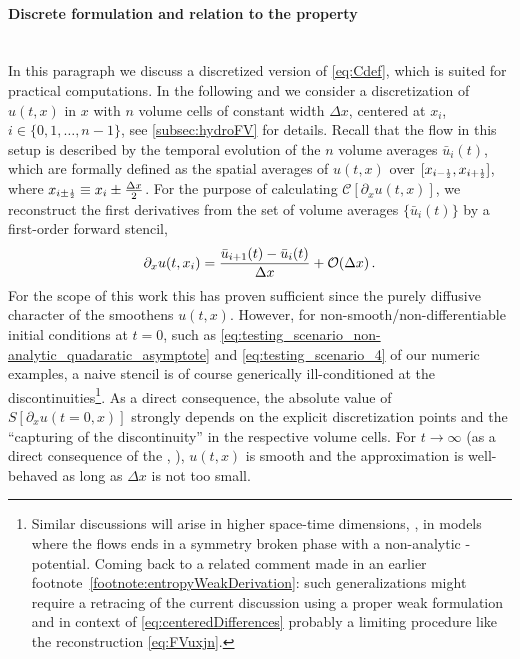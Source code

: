 \paragraph{Discrete formulation and relation to the \tvni{} property}\label{paragraph:discrete_c_and_tvd}\mbox{}\\%
In this paragraph we discuss a discretized version of \cref{eq:Cdef}, which is suited for practical computations.
In the following and \wlogA{} we consider a \fv{} discretization of $u ( t, x )$ in $x$ with $n$ volume cells of constant width $\Delta x$, centered at $x_i$, $i \in \{ 0, 1, \ldots, n - 1\}$, see \cref{subsec:hydroFV} for details.
Recall that the \frg{} flow in this setup is described by the temporal evolution of the $n$ volume averages $\bar{u}_i ( t )$, which are formally defined as the spatial averages of $u ( t, x )$ over $[ x_{i - \ttfrac{1}{2}}, x_{i + \ttfrac{1}{2}} ]$, where $x_{i \pm \ttfrac{1}{2}} \equiv x_i \pm \tfrac{\Delta x}{2}$.
For the purpose of calculating $\mathcal{C} [ \partial_x u ( t, x ) ]$, we reconstruct the first derivatives from the set of volume averages $\{\bar{u}_i(t)\}$ by a first-order \fd{} forward stencil,
\begin{align}
	\partial_x u ( t, x_i ) = \frac{\bar{u}_{i + 1} ( t ) - \bar{u}_{i} ( t )}{\Delta x} + \mathcal{O} (\Delta x) \, .	\label{eq:centeredDifferences}
\end{align}
For the scope of this work this has proven sufficient since the purely diffusive character of the \pde{} smoothens $u ( t, x )$.
However, for non-smooth/non-differentiable initial conditions at $t = 0$, such as \cref{eq:testing_scenario_non-analytic_quadaratic_asymptote} and \eqref{eq:testing_scenario_4} of our numeric examples, a naive \fd{} stencil is of course generically ill-conditioned at the discontinuities\footnote{
	Similar discussions will arise in higher space-time dimensions, \eg{}, in models where the \frg{} flows ends in a symmetry broken phase with a non-analytic \ir{}-potential. 
	Coming back to a related comment made in an earlier footnote~\ref{footnote:entropyWeakDerivation}: such generalizations might require a retracing of the current discussion using a proper weak formulation and in context of \cref{eq:centeredDifferences} probably a limiting procedure like the \muscl{} reconstruction \eqref{eq:FVuxjn}.
}.
As a direct consequence, the absolute value of $S [ \partial_x u ( t = 0, x ) ]$ strongly depends on the explicit discretization points and the ``capturing of the discontinuity'' in the respective volume cells.
For $t \rightarrow \infty$ (as a direct consequence of the \cmwhTheoremWithRefs{}, \cf{} \MWApp{}), $u ( t, x )$ is smooth and the \fd{} approximation is well-behaved as long as $\Delta x$ is not too small.
